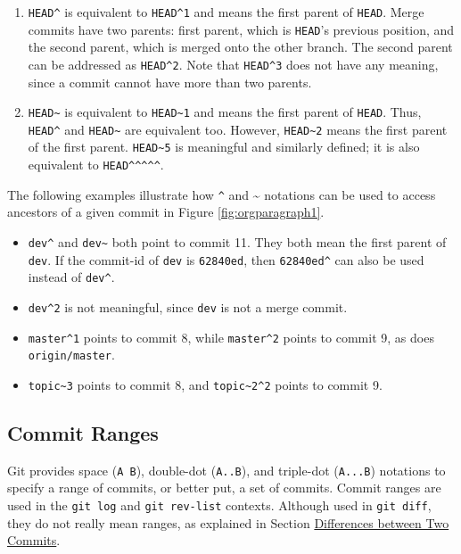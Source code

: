 \documentclass[11pt]{article}
\begin{document}
\begin{enumerate}
\item \texttt{HEAD\textasciicircum{}} is equivalent to \texttt{HEAD\textasciicircum{}1} and means the first parent of \texttt{HEAD}. Merge commits have two parents: first parent, which is \texttt{HEAD}'s previous position, and the second parent, which is merged onto the other branch. The second parent can be addressed as \texttt{HEAD\textasciicircum{}2}. Note that \texttt{HEAD\textasciicircum{}3} does not have any meaning, since a commit cannot have more than two parents.
\item \texttt{HEAD\textasciitilde{}} is equivalent to \texttt{HEAD\textasciitilde{}1} and means the first parent of \texttt{HEAD}. Thus, \texttt{HEAD\textasciicircum{}} and \texttt{HEAD\textasciitilde{}} are equivalent too. However, \texttt{HEAD\textasciitilde{}2} means the first parent of the first parent. \texttt{HEAD\textasciitilde{}5} is meaningful and similarly defined; it is also equivalent to \texttt{HEAD\textasciicircum{}\textasciicircum{}\textasciicircum{}\textasciicircum{}\textasciicircum{}}.
\end{enumerate}

The following examples illustrate how \texttt{\textasciicircum{}} and \textasciitilde{} notations can be used to access ancestors of a given commit in Figure \ref{fig:orgparagraph1}.

\begin{itemize}
\item \texttt{dev\textasciicircum{}} and \texttt{dev\textasciitilde{}} both point to commit 11. They both mean the first parent of \texttt{dev}. If the commit-id of \texttt{dev} is \texttt{62840ed}, then \texttt{62840ed\textasciicircum{}} can also be used instead of \texttt{dev\textasciicircum{}}.
\item \texttt{dev\textasciicircum{}2} is not meaningful, since \texttt{dev} is not a merge commit.
\item \texttt{master\textasciicircum{}1} points to commit 8, while \texttt{master\textasciicircum{}2} points to commit 9, as does \texttt{origin/master}.
\item \texttt{topic\textasciitilde{}3} points to commit 8, and \texttt{topic\textasciitilde{}2\textasciicircum{}2} points to commit 9.
\end{itemize}

\subsection{\label{orgtarget3} Commit Ranges}
\label{sec:orgheadline5}
Git provides space (\texttt{A B}), double-dot (\texttt{A..B}), and triple-dot (\texttt{A...B}) notations to specify a range of commits, or better put, a set of commits. Commit ranges are used in the \texttt{git log} and \texttt{git rev-list} contexts. Although used in \texttt{git diff}, they do not really mean ranges, as explained in Section \hyperref[orgtarget2]{Differences between Two Commits}.
\end{document}
